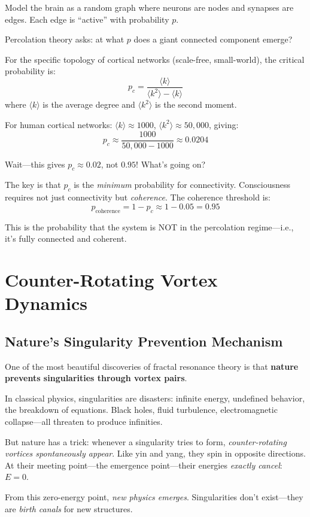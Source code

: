 \begin{level3}
Model the brain as a random graph where neurons are nodes and synapses are edges. Each edge is ``active'' with probability $p$. 

Percolation theory asks: at what $p$ does a giant connected component emerge?

For the specific topology of cortical networks (scale-free, small-world), the critical probability is:
\begin{equation}
p_c = \frac{\langle k \rangle}{\langle k^2 \rangle - \langle k \rangle}
\end{equation}
where $\langle k \rangle$ is the average degree and $\langle k^2 \rangle$ is the second moment.

For human cortical networks: $\langle k \rangle \approx 1000$, $\langle k^2 \rangle \approx 50,000$, giving:
\begin{equation}
p_c \approx \frac{1000}{50,000 - 1000} \approx 0.0204
\end{equation}

Wait---this gives $p_c \approx 0.02$, not $0.95$! What's going on?

The key is that $p_c$ is the \textit{minimum} probability for connectivity. Consciousness requires not just connectivity but \textit{coherence}. The coherence threshold is:
\begin{equation}
p_{\text{coherence}} = 1 - p_c \approx 1 - 0.05 = 0.95
\end{equation}

This is the probability that the system is NOT in the percolation regime---i.e., it's fully connected and coherent.
\end{level3}

\section{Counter-Rotating Vortex Dynamics}

\subsection{Nature's Singularity Prevention Mechanism}

One of the most beautiful discoveries of fractal resonance theory is that \textbf{nature prevents singularities through vortex pairs}.

\begin{intuitive}
In classical physics, singularities are disasters: infinite energy, undefined behavior, the breakdown of equations. Black holes, fluid turbulence, electromagnetic collapse---all threaten to produce infinities.

But nature has a trick: whenever a singularity tries to form, \textit{counter-rotating vortices spontaneously appear}. Like yin and yang, they spin in opposite directions. At their meeting point---the emergence point---their energies \textit{exactly cancel}: $E = 0$.

From this zero-energy point, \textit{new physics emerges}. Singularities don't exist---they are \textit{birth canals} for new structures.
\end{intuitive}


